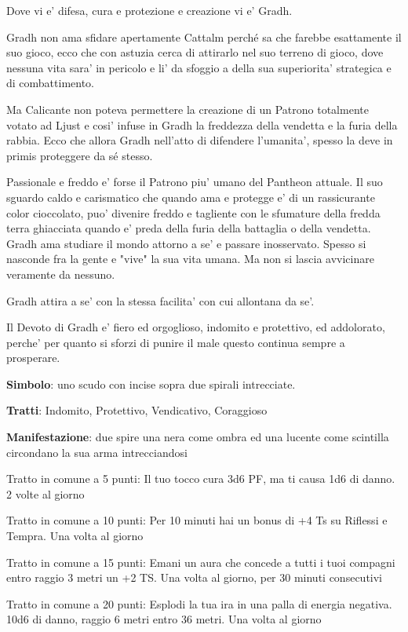 \documentclass[a4paper,11pt,twoside,openany]{book}
\begin{document}
{		Dove vi e' difesa, cura e protezione e creazione vi e' Gradh.
		
		Gradh non ama sfidare apertamente Cattalm perché sa che farebbe esattamente il suo gioco, ecco che con astuzia cerca di attirarlo nel suo terreno di gioco, dove nessuna vita sara' in pericolo e li' da sfoggio a della sua superiorita' strategica e di combattimento.
		
		Ma Calicante non poteva permettere la creazione di un Patrono totalmente votato ad Ljust e cosi' infuse in Gradh la freddezza della vendetta e la furia della rabbia. Ecco che allora Gradh nell'atto di difendere l'umanita', spesso la deve in primis proteggere da sé stesso.
		
		Passionale e freddo e' forse il Patrono piu' umano del Pantheon attuale. Il suo sguardo caldo e carismatico che quando ama e protegge e' di un rassicurante color cioccolato, puo' divenire freddo e tagliente con le sfumature della fredda terra ghiacciata quando e' preda della furia della battaglia o della vendetta. Gradh ama studiare il mondo attorno a se' e passare inosservato. Spesso si nasconde fra la gente e "vive" la sua vita umana. Ma non si lascia avvicinare veramente da nessuno.
		
		Gradh attira a se' con la stessa facilita' con cui allontana da se'.
		
		Il Devoto di Gradh e' fiero ed orgoglioso, indomito e protettivo, ed addolorato, perche' per quanto si sforzi di punire il male questo continua sempre a prosperare.
		
		\textbf{Simbolo}: uno scudo con incise sopra due spirali intrecciate.
		
		\textbf{Tratti}: Indomito, Protettivo, Vendicativo, Coraggioso
		
		\textbf{Manifestazione}: due spire una nera come ombra ed una lucente come scintilla circondano la sua arma intrecciandosi
		
		\bigskip
		
		Tratto in comune a 5 punti: Il tuo tocco cura 3d6 PF, ma ti causa 1d6 di danno. 2 volte al giorno
		
		Tratto in comune a 10 punti: Per 10 minuti hai un bonus di +4 Ts su Riflessi e Tempra. Una volta al giorno
		
		Tratto in comune a 15 punti: Emani un aura che concede a tutti i tuoi compagni entro raggio 3 metri un +2 TS. Una volta al giorno, per 30 minuti consecutivi
		
		Tratto in comune a 20 punti: Esplodi la tua ira in una palla di energia negativa. 10d6 di danno, raggio 6 metri entro 36 metri. Una volta al giorno
		
}
\end{document}

